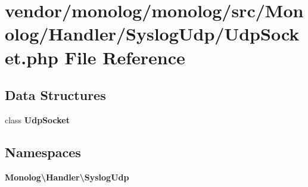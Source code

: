 \section{vendor/monolog/monolog/src/\+Monolog/\+Handler/\+Syslog\+Udp/\+Udp\+Socket.php File Reference}
\label{_udp_socket_8php}
\subsection*{Data Structures}
\begin{DoxyCompactItemize}
\item 
class {\bf Udp\+Socket}
\end{DoxyCompactItemize}
\subsection*{Namespaces}
\begin{DoxyCompactItemize}
\item 
 {\bf Monolog\textbackslash{}\+Handler\textbackslash{}\+Syslog\+Udp}
\end{DoxyCompactItemize}
